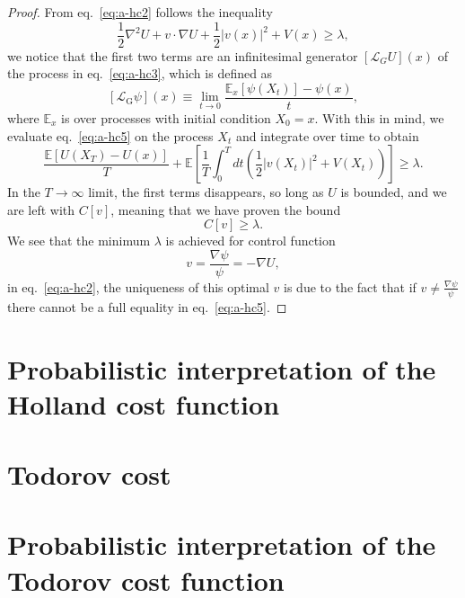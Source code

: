 \begin{proof}
	From eq.~\eqref{eq:a-hc2} follows the inequality
	\begin{equation}
		\label{eq:a-hc5}
		\frac{1}{2} \nabla^{2} U+v \cdot \nabla U+\frac{1}{2}|v(x)|^{2}+V(x) \geq \lambda,
	\end{equation}
	we notice that the first two terms are an infinitesimal generator $[\mathcal{L}_G U](x)$ of the process in eq.~\eqref{eq:a-hc3}, which is defined as
	\begin{equation}
		\left[\mathcal{L}_{\mathrm{G}} \psi\right](x) \equiv \lim _{t \rightarrow 0} \frac{\mathbb{E}_{x}\left[\psi\left(X_{t}\right)\right]-\psi(x)}{t},
	\end{equation} 
	where $\mathbb{E}_x$ is over processes with initial condition $X_0 = x$.
	With this in mind, we evaluate eq.~\eqref{eq:a-hc5} on the process $X_t$ and integrate over time to obtain
	\begin{equation}
		\frac{\mathbb{E}\left[U\left(X_{T}\right)-U(x)\right]}{T}+\mathbb{E}\left[\frac{1}{T}\int_{0}^{T} d t\left(\frac{1}{2}\left|v\left(X_{t}\right)\right|^{2}+V\left(X_{t}\right)\right)\right] \geq \lambda.
	\end{equation}
	In the $T \rightarrow \infty$ limit, the first terms disappears, so long as $U$ is bounded, and we are left with $C[v]$, meaning that we have proven the bound 
	\begin{equation}
		C[v] \geq \lambda.
	\end{equation}
	We see that the minimum $\lambda$ is achieved for control function
	\begin{equation}
		v = \frac{\nabla \psi}{\psi} = -\nabla U,
	\end{equation}
	in eq.~\eqref{eq:a-hc2}, the uniqueness of this optimal $v$ is due to the fact that if $v \neq \frac{\nabla \psi}{\psi}$ there cannot be a full equality in eq.~\eqref{eq:a-hc5}.
\end{proof}


\section{Probabilistic interpretation of the Holland cost function}
\label{app:holland-prob}

\section{Todorov cost}

\section{Probabilistic interpretation of the Todorov cost function}